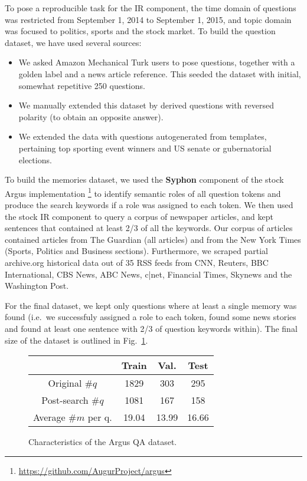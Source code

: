 \documentclass[11pt]{article}
\begin{document}
To pose a reproducible task for the IR component, the time domain
of questions was restricted from September 1, 2014 to September 1, 2015,
and topic domain was focused to politics, sports and the stock market.
To build the question dataset, we have used several sources:
\begin{itemize}
	\item We asked Amazon Mechanical Turk users to pose questions, together with a golden label and a news article reference.
		This seeded the dataset with initial, somewhat repetitive 250 questions.
	\item We manually extended this dataset by derived questions with reversed polarity (to obtain an opposite answer).
	\item We extended the data with questions autogenerated from templates, pertaining top sporting event winners and US senate or gubernatorial elections.
\end{itemize}

To build the memories dataset, we used the \textbf{Syphon} component
\cite{argus}
of the stock Argus implementation%
\footnote{\url{https://github.com/AugurProject/argus}}
to identify semantic roles of all question tokens and produce
the search keywords if a role was assigned to each token.
We then used the stock IR component to query a corpus of newspaper
articles, and kept sentences that contained at least 2/3 of all
the keywords.
Our corpus of articles contained articles from The Guardian (all articles) and from the New York Times (Sports, Politics and Business sections).  Furthermore, we scraped partial archive.org historical data out of 35 RSS feeds from CNN, Reuters, BBC International, CBS News, ABC News, c|net, Financial Times, Skynews and the Washington Post.

For the final dataset, we kept only questions where at least
a single memory was found (i.e.\ we successfuly assigned a role
to each token, found some news stories and found at least one
sentence with 2/3 of question keywords within).  The final size
of the dataset is outlined in Fig.~\ref{tab:dataset}.

\begin{figure}
	\centering
	\begin{tabular}{|c|ccc|}
		\hline
		& Train & Val. & Test \\
		\hline
		Original $\#q$ & 1829 & 303 & 295 \\
		Post-search $\#q$ & 1081 & 167 & 158 \\
		Average $\#m$ per q. & 19.04 & 13.99 & 16.66 \\
		\hline
	\end{tabular}
	\vspace*{-0.2cm}
	\caption{\footnotesize%
		Characteristics of the Argus QA dataset.
	}
	\label{tab:dataset}
\end{figure}
\end{document}
